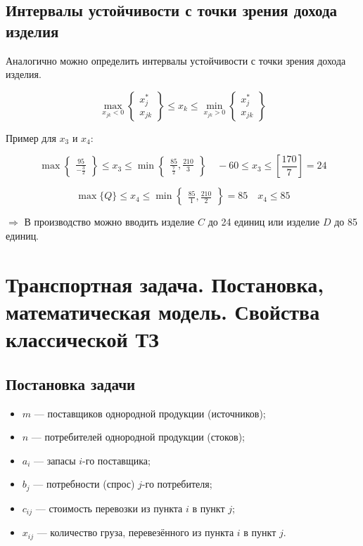 \documentclass[17pt]{extarticle}
\begin{document}
\subsection{Интервалы устойчивости с точки зрения дохода изделия}
Аналогично можно определить интервалы устойчивости с точки зрения дохода изделия.

\[
    \max_{x_{jk} < 0} \left\{
    \begin{array}{c}
        x_j^* \\
        x_{jk}
    \end{array}
    \right\} \leq x_k \leq \min_{x_{jk} > 0} \left\{
    \begin{array}{c}
        x_j^* \\
        x_{jk}
    \end{array}
    \right\}
\]

Пример для \( x_3 \) и \( x_4 \):

\[
    \max \left\{
    \begin{array}{c}
        \frac{95}{-\frac{3}{2}}
    \end{array}
    \right\} \leq x_3 \leq \min \left\{
    \begin{array}{c}
        \frac{85}{\frac{7}{2}}, \frac{210}{3}
    \end{array}
    \right\} \quad -60 \leq x_3 \leq \left[ \frac{170}{7} \right] = 24
\]

\[
    \max \{Q\} \leq x_4 \leq \min \left\{
    \begin{array}{c}
        \frac{85}{1}, \frac{210}{2}
    \end{array}
    \right\} = 85 \quad x_4 \leq 85
\]

\(\Rightarrow\) В производство можно вводить изделие \( C \) до 24 единиц или изделие \( D \) до 85 единиц.


\section{Транспортная задача. Постановка, \\ математическая модель. Свойства \\ классической ТЗ}
\subsection{Постановка задачи}
\begin{itemize}
    \item \( m \) — поставщиков однородной продукции (источников);
    \item \( n \) — потребителей однородной продукции (стоков);
    \item \( a_i \) — запасы \( i \)-го поставщика;
    \item \( b_j \) — потребности (спрос) \( j \)-го потребителя;
    \item \( c_{ij} \) — стоимость перевозки из пункта \( i \) в пункт \( j \);
    \item \( x_{ij} \) — количество груза, перевезённого из пункта \( i \) в пункт \( j \).
\end{itemize}
\end{document}
